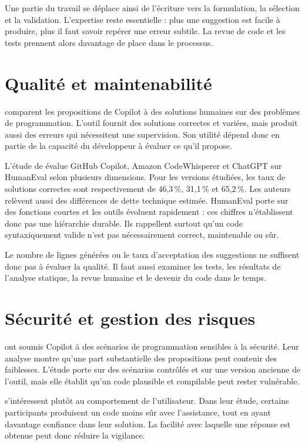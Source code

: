 \documentclass[12pt,a4paper,oneside]{report}
\newcommand{\taux}[1]{#1\,\%}
\begin{document}
Une partie du travail se déplace ainsi de l'écriture vers la formulation, la sélection et la validation. L'expertise reste essentielle : plus une suggestion est facile à produire, plus il faut savoir repérer une erreur subtile. La revue de code et les tests prennent alors davantage de place dans le processus.

\section{Qualité et maintenabilité}

\textcite{dakhel2023asset} comparent les propositions de Copilot à des solutions humaines sur des problèmes de programmation. L'outil fournit des solutions correctes et variées, mais produit aussi des erreurs qui nécessitent une supervision. Son utilité dépend donc en partie de la capacité du développeur à évaluer ce qu'il propose.

L'étude de \textcite{yetistiren2023quality} évalue GitHub Copilot, Amazon CodeWhisperer et ChatGPT sur HumanEval selon plusieurs dimensions. Pour les versions étudiées, les taux de solutions correctes sont respectivement de \taux{46,3}, \taux{31,1} et \taux{65,2}. Les auteurs relèvent aussi des différences de dette technique estimée. HumanEval porte sur des fonctions courtes et les outils évoluent rapidement : ces chiffres n'établissent donc pas une hiérarchie durable. Ils rappellent surtout qu'un code syntaxiquement valide n'est pas nécessairement correct, maintenable ou sûr.

Le nombre de lignes générées ou le taux d'acceptation des suggestions ne suffisent donc pas à évaluer la qualité. Il faut aussi examiner les tests, les résultats de l'analyse statique, la revue humaine et le devenir du code dans le temps.

\section{Sécurité et gestion des risques}

\textcite{pearce2022security} ont soumis Copilot à des scénarios de programmation sensibles à la sécurité. Leur analyse montre qu'une part substantielle des propositions peut contenir des faiblesses. L'étude porte sur des scénarios contrôlés et sur une version ancienne de l'outil, mais elle établit qu'un code plausible et compilable peut rester vulnérable.

\textcite{perry2023insecure} s'intéressent plutôt au comportement de l'utilisateur. Dans leur étude, certains participants produisent un code moins sûr avec l'assistance, tout en ayant davantage confiance dans leur solution. La facilité avec laquelle une réponse est obtenue peut donc réduire la vigilance.
\end{document}
